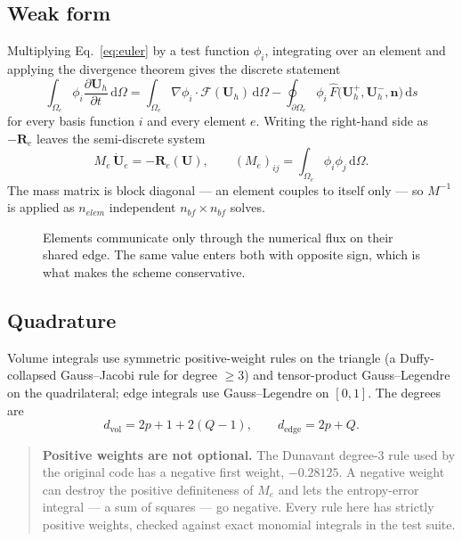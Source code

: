 \documentclass[11pt,a4paper]{article}
\newcommand{\vect}[1]{\boldsymbol{#1}}
\newcommand{\Uvec}{\vect{U}}
\newcommand{\nvec}{\vect{n}}
\begin{document}
\subsection{Weak form}

Multiplying Eq.~\eqref{eq:euler} by a test function $\phi_i$, integrating over an
element and applying the divergence theorem gives the discrete statement
\begin{equation}
  \boxed{\;
  \int_{\Omega_e} \phi_i \frac{\partial \Uvec_h}{\partial t}\,\mathrm{d}\Omega
  =
  \int_{\Omega_e} \nabla \phi_i \cdot \vect{\mathcal{F}}(\Uvec_h)\,\mathrm{d}\Omega
  - \oint_{\partial \Omega_e} \phi_i\,
    \hat{F}\bigl(\Uvec_h^{+}, \Uvec_h^{-}, \nvec\bigr)\,\mathrm{d}s \;}
  \label{eq:weak}
\end{equation}
for every basis function $i$ and every element $e$.  Writing the right-hand side
as $-\vect{R}_e$ leaves the semi-discrete system
\begin{equation}
  M_e\, \dot{\Uvec}_e = -\vect{R}_e(\Uvec),
  \qquad
  (M_e)_{ij} = \int_{\Omega_e} \phi_i \phi_j\,\mathrm{d}\Omega .
  \label{eq:semidiscrete}
\end{equation}
The mass matrix is block diagonal --- an element couples to itself only --- so
$M^{-1}$ is applied as $n_{elem}$ independent $n_{bf} \times n_{bf}$ solves.

\begin{figure}[H]
  \centering
  \resizebox{0.95\textwidth}{!}{}
  \caption{Elements communicate only through the numerical flux on their shared
    edge.  The same value enters both with opposite sign, which is what makes
    the scheme conservative.}
  \label{fig:coupling}
\end{figure}

\subsection{Quadrature}

Volume integrals use symmetric positive-weight rules on the triangle (a
Duffy-collapsed Gauss--Jacobi rule for degree $\ge 3$) and tensor-product
Gauss--Legendre on the quadrilateral; edge integrals use Gauss--Legendre on
$[0,1]$.  The degrees are
\begin{equation}
  d_{\mathrm{vol}} = 2p + 1 + 2(Q-1),
  \qquad
  d_{\mathrm{edge}} = 2p + Q .
\end{equation}

\begin{quote}
\textbf{Positive weights are not optional.}  The Dunavant degree-3 rule used by
the original code has a negative first weight, $-0.28125$.  A negative weight can
destroy the positive definiteness of $M_e$ and lets the entropy-error integral
--- a sum of squares --- go negative.  Every rule here has strictly positive
weights, checked against exact monomial integrals in the test suite.
\end{quote}
\end{document}
